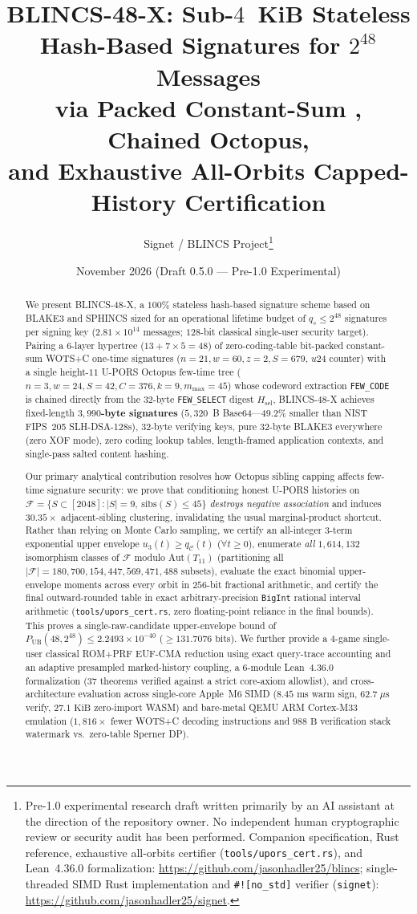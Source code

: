 \documentclass[11pt,a4paper]{article}
\title{\textbf{BLINCS-48-X}: Sub-$4$~KiB Stateless Hash-Based Signatures for $2^{48}$ Messages\\
via Packed Constant-Sum \WOTSC{}, Chained \UPORS{} Octopus,\\
and Exhaustive All-Orbits Capped-History Certification}
\author{
  Signet / BLINCS Project\thanks{Pre-1.0 experimental research draft written primarily by an AI assistant at the direction of the repository owner. No independent human cryptographic review or security audit has been performed. Companion specification, Rust reference, exhaustive all-orbits certifier (\texttt{tools/upors\_cert.rs}), and Lean~4.36.0 formalization: \url{https://github.com/jasonhadler25/blincs}; single-threaded SIMD Rust implementation and \texttt{\#![no\_std]} verifier (\texttt{signet}): \url{https://github.com/jasonhadler25/signet}.}
}
\date{November 2026 \quad (Draft 0.5.0 --- Pre-1.0 Experimental)}
\theoremstyle{definition}
\theoremstyle{remark}
\newcommand{\BLINCS}{\textsf{BLINCS-48-X}}
\newcommand{\WOTSC}{\textsf{WOTS+C}}
\newcommand{\UPORS}{\textsf{U-PORS}}
\newcommand{\BLAKE}{\textsf{BLAKE3}}
\newcommand{\calF}{\mathcal{F}}
\newcommand{\calC}{\mathcal{C}}
\begin{document}
\maketitle

\begin{abstract}
We present \BLINCS{}, a $100\%$ stateless hash-based signature scheme based on \BLAKE{} and SPHINCS sized for an operational lifetime budget of $q_s \le 2^{48}$ signatures per signing key ($2.81 \times 10^{14}$ messages; $128$-bit classical single-user security target). Pairing a $6$-layer hypertree ($13 + 7{\times}5 = 48$) of zero-coding-table bit-packed constant-sum \WOTSC{} one-time signatures ($n = 21, w = 60, z = 2, S = 679$, $u24$ counter) with a single height-$11$ \UPORS{} Octopus few-time tree ($n = 3, w = 24, S = 42, C = 376, k = 9, m_{\max} = 45$) whose codeword extraction \texttt{FEW\_CODE} is chained directly from the $32$-byte \texttt{FEW\_SELECT} digest $H_{\mathrm{sel}}$, \BLINCS{} achieves fixed-length \textbf{$3{,}990$-byte signatures} ($5{,}320$~B Base64---$49.2\%$ smaller than NIST FIPS~205 \textsf{SLH-DSA-128s}), $32$-byte verifying keys, pure $32$-byte \BLAKE{} everywhere (zero XOF mode), zero coding lookup tables, length-framed application contexts, and single-pass salted content hashing.

Our primary analytical contribution resolves how Octopus sibling capping affects few-time signature security: we prove that conditioning honest \UPORS{} histories on $\calF = \{S \subset [2048] : |S| = 9,\ \mathrm{sibs}(S) \le 45\}$ \emph{destroys negative association} and induces $30.35\times$ adjacent-sibling clustering, invalidating the usual marginal-product shortcut. Rather than relying on Monte Carlo sampling, we certify an all-integer $3$-term exponential upper envelope $u_3(t) \ge q_\calC(t)$ ($\forall t \ge 0$), enumerate \emph{all} $1{,}614{,}132$ isomorphism classes of $\calF$ modulo $\mathrm{Aut}(T_{11})$ (partitioning all $|\calF| = 180{,}700{,}154{,}447{,}569{,}471{,}488$ subsets), evaluate the exact binomial upper-envelope moments across every orbit in $256$-bit fractional arithmetic, and certify the final outward-rounded table in exact arbitrary-precision \texttt{BigInt} rational interval arithmetic (\texttt{tools/upors\_cert.rs}, zero floating-point reliance in the final bounds). This proves a single-raw-candidate upper-envelope bound of $P_{\mathrm{UB}}(48, 2^{48}) \le 2.2493 \times 10^{-40}$ ($\ge 131.7076\text{ bits}$). We further provide a $4$-game single-user classical ROM+PRF EUF-CMA reduction using exact query-trace accounting and an adaptive presampled marked-history coupling, a $6$-module Lean~4.36.0 formalization ($37$ theorems verified against a strict core-axiom allowlist), and cross-architecture evaluation across single-core Apple~M6 SIMD ($8.45\text{ ms}$ warm sign, $62.7\;\mu\text{s}$ verify, $27.1\text{ KiB}$ zero-import WASM) and bare-metal QEMU ARM Cortex-M33 emulation ($1{,}816\times$ fewer \WOTSC{} decoding instructions and $988\text{ B}$ verification stack watermark vs.\ zero-table Sperner DP).
\end{abstract}
\end{document}
